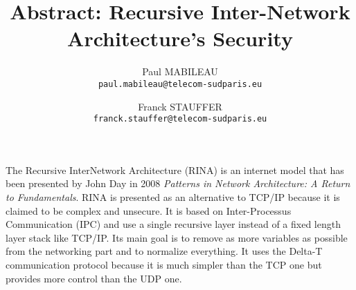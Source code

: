 \documentclass[a4paper]{article}
\author{Paul MABILEAU\\\texttt{paul.mabileau@telecom-sudparis.eu}
        \and Franck STAUFFER\\\texttt{franck.stauffer@telecom-sudparis.eu}}
\title{\textbf{Abstract: Recursive Inter-Network Architecture's Security}}
\begin{document}
\maketitle

The Recursive InterNetwork Architecture (RINA) is an internet model that has
been presented by John Day in 2008 \textit{Patterns in Network Architecture: A
Return to Fundamentals}.  RINA is presented as an alternative to TCP/IP because
it is claimed to be complex and unsecure.  It is based on Inter-Processus
Communication (IPC) and use a single recursive layer instead of a fixed length
layer stack like TCP/IP\@.  Its main goal is to remove as more variables as
possible from the networking part and to normalize everything.  It uses the
Delta-T communication protocol because it is much simpler than the TCP one but
provides more control than the UDP one.
\end{document}
